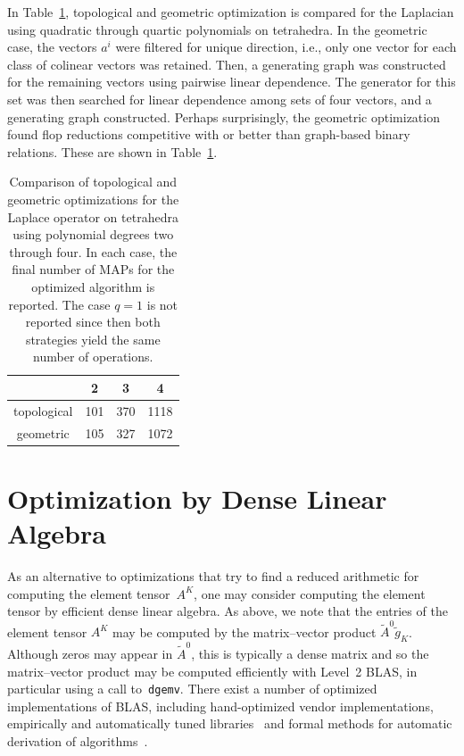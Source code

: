 In Table~\ref{tab:kirby4:geom}, topological and geometric optimization
is compared for the Laplacian using quadratic through quartic
polynomials on tetrahedra.  In the geometric case, the vectors \( a^i
\) were filtered for unique direction, i.e., only one vector for each
class of colinear vectors was retained. Then, a generating graph was
constructed for the remaining vectors using pairwise linear
dependence.  The generator for this set was then searched for linear
dependence among sets of four vectors, and a generating graph
constructed.  Perhaps surprisingly, the geometric optimization found
flop reductions competitive with or better than graph-based binary
relations. These are shown in Table~\ref{tab:kirby4:geom}.

\begin{table}
  \begin{center}
    \begin{tabular}{c|ccc}
      & 2 & 3 & 4 \\ \hline
      topological & 101 & 370 & 1118 \\
      geometric   & 105 & 327 & 1072 \\
    \end{tabular}
    \caption{Comparison of topological and geometric optimizations
      for the Laplace operator on tetrahedra using polynomial degrees two
      through four. In each case, the final number of MAPs for the
      optimized algorithm is reported. The case $q=1$ is not reported
      since then both strategies yield the same number of operations.}
  \end{center}
  \label{tab:kirby4:geom}
\end{table}

\section{Optimization by Dense Linear Algebra}

As an alternative to optimizations that try to find a reduced
arithmetic for computing the element tensor~$A^K$, one may consider
computing the element tensor by efficient dense linear algebra.  As
above, we note that the entries of the element tensor $A^K$ may be
computed by the matrix--vector product $\tilde{A}^0
\tilde{g}_K$. Although zeros may appear in $\tilde{A}^0$, this is
typically a dense matrix and so the matrix--vector product may be
computed efficiently with Level~2 BLAS, in particular using a call
to~\texttt{dgemv}. There exist a number of optimized implementations
of BLAS, including hand-optimized vendor implementations, empirically
and automatically tuned libraries~\cite{blas} and formal methods for
automatic derivation of algorithms~\cite{flame}.

